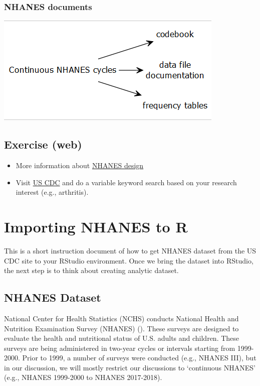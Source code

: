 \documentclass[
]{book}
\providecommand{\tightlist}{%
  \setlength{\itemsep}{0pt}\setlength{\parskip}{0pt}}
\begin{document}
\hypertarget{nhanes-documents}{%
\subsection{NHANES documents}\label{nhanes-documents}}

\includegraphics[width=0.65\linewidth]{images/g3}

\hypertarget{exercise-web}{%
\section{Exercise (web)}\label{exercise-web}}

\begin{itemize}
\tightlist
\item
  More information about \href{https://wwwn.cdc.gov/nchs/nhanes/tutorials/module2.aspx}{NHANES design}
\item
  Visit \href{https://wwwn.cdc.gov/Nchs/Nhanes/search/}{US CDC} and do a variable keyword search based on your research interest (e.g., arthritis).
\end{itemize}

\hypertarget{importing-nhanes-to-r}{%
\chapter{Importing NHANES to R}\label{importing-nhanes-to-r}}

This is a short instruction document of how to get NHANES dataset from the US CDC site to your RStudio environment. Once we bring the dataset into RStudio, the next step is to think about creating analytic dataset.

\hypertarget{nhanes-dataset}{%
\section{NHANES Dataset}\label{nhanes-dataset}}

National Center for Health Statistics (NCHS) conducts National Health and Nutrition Examination Survey (NHANES) (\citet{nhanes}). These surveys are designed to evaluate the health and nutritional status of U.S. adults and children. These surveys are being administered in two-year cycles or intervals starting from 1999-2000. Prior to 1999, a number of surveys were conducted (e.g., NHANES III), but in our discussion, we will mostly restrict our discussions to `continuous NHANES' (e.g., NHANES 1999-2000 to NHANES 2017-2018).
\end{document}
